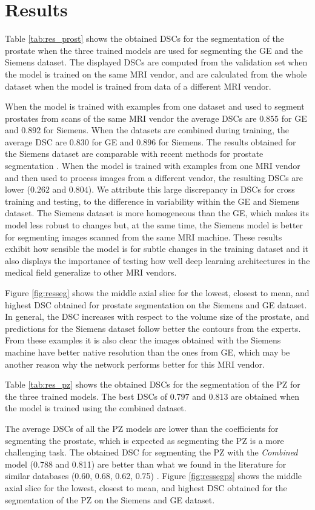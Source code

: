 \section{Results}
Table \ref{tab:res_prost} shows the obtained DSCs for the segmentation of the prostate when the three trained models are used for segmenting the GE and the Siemens dataset. The displayed DSCs are computed from the validation set when the model is trained on the same MRI vendor, and are calculated from the whole dataset when the model is trained from data of a different MRI vendor.

When the model is trained with examples from one dataset and used to segment prostates from scans of the same MRI vendor the average DSCs are $0.855$ for GE and $0.892$ for Siemens. When the datasets are combined during training, the average DSC are $0.830$ for GE and $0.896$ for Siemens.  The results obtained for the Siemens dataset are comparable with recent methods for prostate segmentation \cite{guo2016deformable, lozoya2018assessing, jia20183d}. When the model is trained with examples from one MRI vendor and then used to process images from a different vendor, the resulting DSCs are lower ($0.262$ and $0.804$). We attribute this large discrepancy in DSCs for cross training and testing, to the difference in variability within the GE and Siemens dataset. The Siemens dataset is more homogeneous than the GE, which makes its model less robust to changes but, at the same time, the Siemens model is better for segmenting images scanned from the same MRI machine. These results exhibit how sensible the model is for subtle changes in the training dataset and it also displays the importance of testing how well deep learning architectures in the medical field generalize to other MRI vendors. 

Figure \ref{fig:resseg} shows the middle axial slice for the lowest, closest to mean, and highest DSC obtained for prostate segmentation on the Siemens and GE dataset. In general, the DSC increases with respect to the volume size of the prostate, and predictions for the Siemens dataset follow better the contours from the experts. From these examples it is also clear the images obtained with the Siemens machine have better native resolution than the ones from GE, which may be another reason why the network performs better for this MRI vendor. 

Table \ref{tab:res_pz} shows the obtained DSCs for the segmentation of the PZ for the three trained models.  The best DSCs of $0.797$ and $0.813$ are obtained when the model is trained using the combined dataset.  

The average DSCs of all the PZ models are lower than the coefficients for segmenting the prostate, which is expected as segmenting the PZ is a more challenging task. The obtained DSC for segmenting the PZ with the \emph{Combined} model (0.788 and 0.811) are better than what we found in the literature for similar databases (0.60, 0.68, 0.62, 0.75) \cite{mooij_automatic_2018,toth_simultaneous_2013, chilali_gland_2016, hutchison_pattern_2012}. Figure \ref{fig:ressegpz} shows the middle axial slice for the lowest, closest to mean, and highest DSC obtained for the segmentation of the PZ on the Siemens and GE dataset. 
